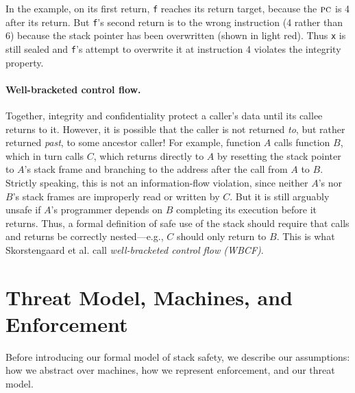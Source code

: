 \documentclass[10pt,conference]{ieeetran}%
\theoremstyle{definition}
\begin{document}
In the example, on its first return, {\tt f} reaches its return target, because the
\(\textsc{pc}\) is 4 after its return. But {\tt f}'s second return is to the wrong instruction
(4 rather than 6) because the stack pointer has been overwritten (shown in light red).
Thus {\tt x} is still sealed and {\tt f}'s attempt to overwrite it at instruction 4
violates the integrity property.

\paragraph*{Well-bracketed control flow.} Together,
integrity and confidentiality protect a caller's data until its callee
returns to it. However, it is possible that the caller is not
returned {\em to}, but rather returned {\em past}, to some ancestor caller!
For example, function $A$ calls function $B$, which in turn calls $C$, which
returns directly to $A$ by resetting the stack pointer to $A$'s stack frame
and branching to the address after the call from $A$ to $B$.  Strictly
speaking, this is not an information-flow violation, since neither $A$'s nor
$B$'s stack frames are improperly read or written by $C$.  But it is still
arguably unsafe if $A$'s programmer depends on $B$ completing its execution before
it returns.
%
Thus, a formal definition of safe use of the stack should require that calls
and returns be correctly nested---e.g., $C$ should
only return to $B$.  This is what Skorstengaard et al.\cite{SkorstengaardSTKJFP}
call \emph{well-bracketed control flow (WBCF)}.

\section{Threat Model, Machines, and Enforcement }
\label{sec:setup}
\label{sec:threat}

Before introducing our formal model of stack safety, we describe our assumptions:
how we abstract over machines, how we represent enforcement, and
our threat model.
\end{document}
